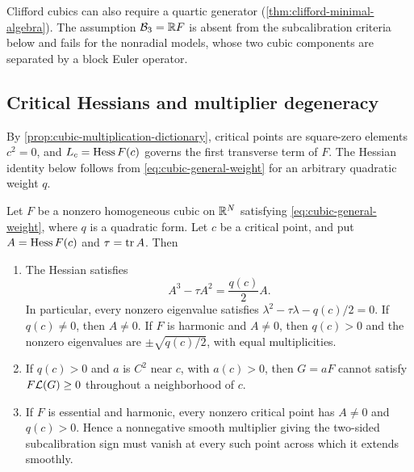 Clifford cubics can also require a quartic generator
(\cref{thm:clifford-minimal-algebra}). The assumption
\(\mathcal B_3=\mathbb R F\) is absent from the subcalibration criteria below
and fails for the nonradial models, whose two cubic components are
separated by a block Euler operator.

\subsection{Critical Hessians and multiplier degeneracy}
\label{sec:cubic-square-zero-obstruction}

By \cref{prop:cubic-multiplication-dictionary}, critical points are
square-zero elements \(c^2=0\), and \(L_c=\operatorname{Hess} F(c)\) governs
the first transverse term of \(F\). The Hessian identity below follows
from \eqref{eq:cubic-general-weight} for an arbitrary quadratic weight
\(q\).

\begin{proposition}
\label{prop:cubic-general-singular-spectrum}
\label{prop:cubic-positive-multiplier-obstruction}
\label{cor:cubic-essential-multiplier-obstruction}
Let $F$ be a nonzero homogeneous cubic on $\mathbb R^N$ satisfying
\eqref{eq:cubic-general-weight}, where $q$ is a quadratic form. Let $c$ be a critical point, and put
$A=\operatorname{Hess} F(c)$ and $\tau=\operatorname{tr} A$. Then
\begin{enumerate}[label=\textup{(\roman*)}]
\item The Hessian satisfies
\begin{equation}\label{eq:cubic-general-hessian-polynomial}
 A^3-\tau A^2=\frac{q(c)}2 A.
\end{equation}
In particular, every nonzero eigenvalue satisfies
$\lambda^2-\tau\lambda-q(c)/2=0$. If $q(c)\ne0$, then $A\ne0$.
If $F$ is harmonic and $A\ne0$, then $q(c)>0$ and the nonzero eigenvalues are
$\pm\sqrt{q(c)/2}$, with equal multiplicities.
\item If $q(c)>0$ and $a$ is $C^2$ near $c$, with $a(c)>0$,
then $G=aF$ cannot satisfy $F\mathcal L(G)\ge0$ throughout a neighborhood
of $c$.
\item If $F$ is essential and harmonic, every nonzero critical point
has $A\ne0$ and $q(c)>0$. Hence a nonnegative smooth multiplier
giving the two-sided subcalibration sign must vanish at every such
point across which it extends smoothly.
\end{enumerate}
\end{proposition}

